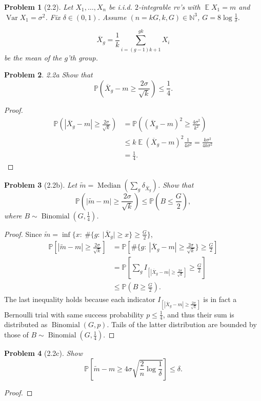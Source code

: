 \documentclass{article}
\newtheorem{problem}{Problem}
\newcommand{\expect}{\operatorname{\mathbb{E}}}
\begin{document}
\begin{problem}[2.2]
Let \( X_1, \ldots, X_n \)
be i.i.d. \( 2 \)-integrable rv's
with \( \expect X_1 = m \)
and \( \operatorname{Var}X_1 = \sigma^2 \).
Fix \( \delta\in(0,1) \).
Assume \( (n=kG, k, G)\in \mathbb{N}^3 \),
\( G = 8\log\frac1\delta \).

\[
\overline{X}_g = \frac1k \sum_{i=(g-1)k+1}^{gk} X_i
\]
be the mean of the \( g \)'th group.
\end{problem}
\begin{problem}{2.2a}
Show that \[
\mathbb{P}(\overline{X}_g - m \geq \frac{2\sigma}{\sqrt{k}}) \leq \frac14.
\]
\end{problem}
\begin{proof}
\[\begin{split}
\mathbb{P}\left(|\overline{X}_g - m| \geq \frac{2\sigma}{\sqrt{k}}\right)
&= \mathbb{P}\left((\overline{X}_g - m)^2 \geq \frac{4\sigma^2}{k^2}\right) \\
&\leq k\expect(\overline{X}_g - m)^2\frac{1}{4\sigma^2} = \frac{k\sigma^2}{4k\sigma^2} \\
&= \frac14.
\end{split}\]

\end{proof}

\begin{problem}[2.2b]
Let \( \tilde{m} = \operatorname{Median}(\sum_g \delta_{\overline{X}_g}) \).
Show that
\[
\mathbb{P}\left(\lvert\tilde{m} - m\rvert \geq \frac{2\sigma}{\sqrt{k}}\right)
\leq \mathbb{P}(B \leq \frac{G}{2}),
\]
where \( B\sim\operatorname{Binomial}(G, \frac14) \).
\end{problem}
\begin{proof}
Since \( \tilde{m} = \inf\{x:~\#\{g:~\lvert\overline{X}_g\rvert\geq x\} \geq \frac{G}{2}\} \),
\[\begin{split}
\mathbb{P}\left[|\tilde{m} - m| \geq \frac{2\sigma}{\sqrt{k}} \right]
&= \mathbb{P}\left[
\#\{g:~|\overline{X}_g - m|\geq \frac{2\sigma}{\sqrt{k}}\} \geq \frac{G}{2}
\right]
\\
&= \mathbb{P}\left[
\sum_g I_{[|\overline{X}_g - m|\geq \frac{2\sigma}{\sqrt{k}}]} \geq \frac{G}{2}
\right]
\\
&\leq \mathbb{P}(B\geq \frac{G}{2}).
\end{split}\]
The last inequality holds because
each indicator \( I_{[|\overline{X}_g - m|\geq \frac{2\sigma}{\sqrt{k}}]} \)
is in fact a Bernoulli trial with same success probability \( p\leq\frac14 \),
and thus their sum is distributed as \( \operatorname{Binomial}(G, p) \).
Tails of the latter distribution are bounded by those
of \( B\sim\operatorname{Binomial}(G, \frac14) \).
\end{proof}

\begin{problem}[2.2c]
Show
\[ \mathbb{P}\left[ \tilde{m} - m  \geq 4\sigma\sqrt{\frac{2}{n}\log\frac1\delta}\right] \leq \delta. \]
\end{problem}
\begin{proof}
\end{proof}
\end{document}
